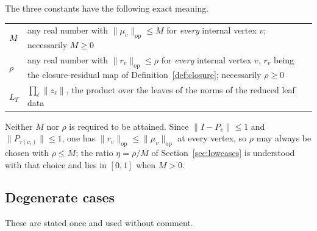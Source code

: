 \documentclass[11pt]{amsart}
\theoremstyle{definition}
\theoremstyle{remark}
\newcommand{\op}{\mathrm{op}}
\newcommand{\norm}[1]{\lVert#1\rVert}
\begin{document}
The three constants have the following exact meaning.

\begin{center}
\small
\begin{tabularx}{\linewidth}{@{}lX@{}}
\toprule
$M$ & any real number with $\norm{\mu_v}_\op\le M$ for \emph{every} internal vertex $v$;
necessarily $M\ge0$ \\
$\rho$ & any real number with $\norm{r_v}_\op\le\rho$ for \emph{every} internal vertex $v$,
$r_v$ being the closure-residual map of Definition~\ref{def:closure}; necessarily
$\rho\ge0$ \\
$L_T$ & $\prod_{\ell}\norm{z_\ell}$, the product over the leaves of the norms of the
reduced leaf data \\
\bottomrule
\end{tabularx}
\end{center}

Neither $M$ nor $\rho$ is required to be attained. Since $\norm{I-P_v}\le1$ and
$\norm{P_{\tau(c_i)}}\le1$, one has $\norm{r_v}_\op\le\norm{\mu_v}_\op$ at every vertex, so
$\rho$ may always be chosen with $\rho\le M$; the ratio $\eta=\rho/M$ of
Section~\ref{sec:lowcases} is understood with that choice and lies in $[0,1]$ when $M>0$.

\subsection{Degenerate cases}
\label{sec:degenerate}

These are stated once and used without comment.
\end{document}
